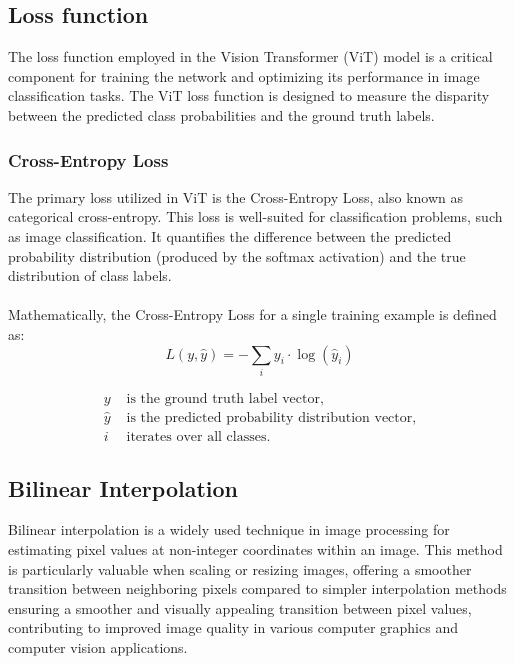 \subsection{Loss function }
The loss function employed in the Vision Transformer (ViT) model is a critical component for training the network and optimizing its performance in image classification tasks. The ViT loss function is designed to measure the disparity between the predicted class probabilities and the ground truth labels.


\subsubsection{Cross-Entropy Loss}
The primary loss utilized in ViT is the Cross-Entropy Loss, also known as categorical cross-entropy. This loss is well-suited for classification problems, such as image classification. It quantifies the difference between the predicted probability distribution (produced by the softmax activation) and the true distribution of class labels.
\\
\\
Mathematically, the Cross-Entropy Loss for a single training example is defined as:
\\

\[
L(y, \hat{y}) = -\sum_i y_i \cdot \log(\hat{y}_i)
\]

\begin{align*}
y & \text{ is the ground truth label vector,} \\
\hat{y} & \text{ is the predicted probability distribution vector,} \\
i & \text{ iterates over all classes.}
\end{align*}

\subsection{Bilinear Interpolation }
Bilinear interpolation is a widely used technique in image processing for estimating pixel values at non-integer coordinates within an image. This method is particularly valuable when scaling or resizing images, offering a smoother transition between neighboring pixels compared to simpler interpolation methods ensuring a smoother and visually appealing transition between pixel values, contributing to improved image quality in various computer graphics and computer vision applications.   
